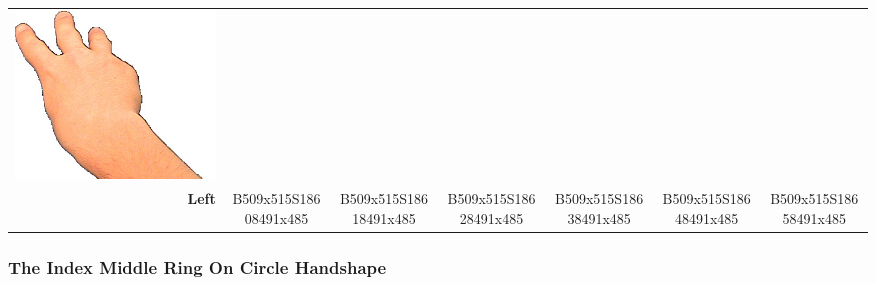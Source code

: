 \documentclass{article}
\begin{document}
\begin{center}
\begin{tabular}{r*{6}{c}}
\includegraphics[scale=0.1]{images/06-01-6.jpg}\\
\textbf{Left}&
B509x515S18608491x485&
B509x515S18618491x485&
B509x515S18628491x485&
B509x515S18638491x485&
B509x515S18648491x485&
B509x515S18658491x485\\
\end{tabular}
\end{center}

\subsubsection{The Index Middle Ring On Circle Handshape}
\end{document}
